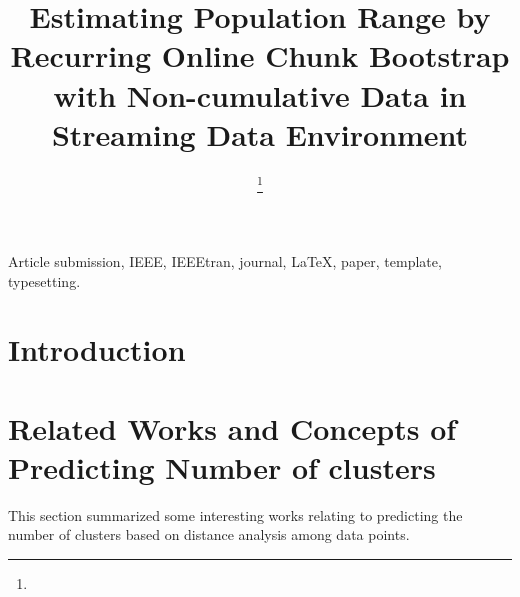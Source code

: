 \documentclass[lettersize,journal]{IEEEtran}
\begin{document}
\title{Estimating Population Range by Recurring Online Chunk Bootstrap with Non-cumulative
Data in Streaming Data Environment}

\author{
\thanks{}}




\maketitle

\begin{abstract}

\end{abstract}

\begin{IEEEkeywords}
Article submission, IEEE, IEEEtran, journal, \LaTeX, paper, template, typesetting.
\end{IEEEkeywords}

\section{Introduction}
\IEEEPARstart{}{} 

\IEEEpubidadjcol



\section{Related Works and Concepts of Predicting Number of clusters}

This section summarized some interesting works relating to predicting the number of clusters based on 
distance analysis among data points.

\IEEEpubidadjcol
\end{document}
